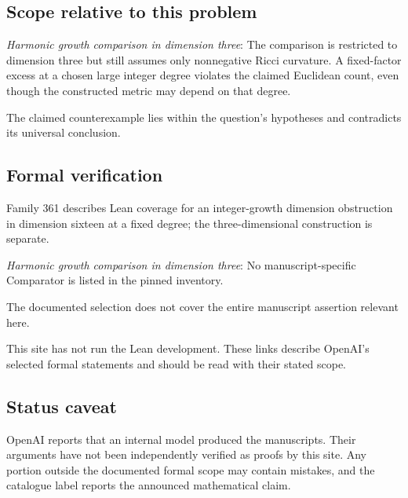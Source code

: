 \documentclass[11pt]{article}
\begin{document}
\subsection{Scope relative to this problem}
\textit{Harmonic growth comparison in dimension three}: The comparison is restricted to dimension three but still assumes only nonnegative Ricci curvature. A fixed-factor excess at a chosen large integer degree violates the claimed Euclidean count, even though the constructed metric may depend on that degree.

The claimed counterexample lies within the question’s hypotheses and contradicts its universal conclusion.

\subsection{Formal verification}
Family 361 describes Lean coverage for an integer-growth dimension obstruction in dimension sixteen at a fixed degree; the three-dimensional construction is separate.

\textit{Harmonic growth comparison in dimension three}: No manuscript-specific Comparator is listed in the pinned inventory.

The documented selection does not cover the entire manuscript assertion relevant here.

This site has not run the Lean development. These links describe OpenAI’s selected formal statements and should be read with their stated scope.

\subsection{Status caveat}
OpenAI reports that an internal model produced the manuscripts. Their arguments have not been independently verified as proofs by this site. Any portion outside the documented formal scope may contain mistakes, and the catalogue label reports the announced mathematical claim.
\end{document}
